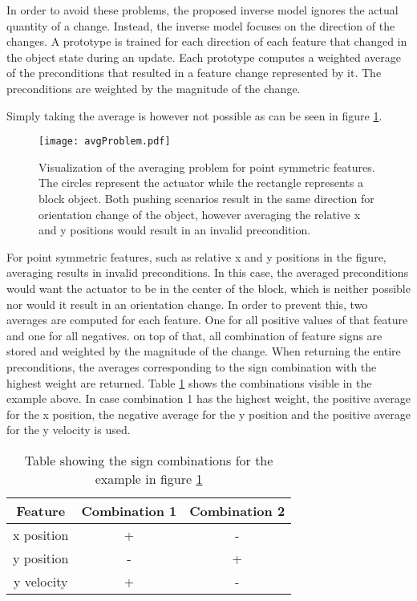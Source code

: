 In order to avoid these problems, the proposed inverse model ignores the actual quantity of a change. Instead, the inverse model focuses on the direction of the changes. A prototype is trained for each direction of each feature that changed in the object state during an update. Each prototype computes a weighted average of the preconditions that resulted in a feature change represented by it. The preconditions are weighted by the magnitude of the change. 

Simply taking the average is however not possible as can be seen in figure \ref{fig:avgProblem}.

\begin{figure}
	\centering
	\texttt{[image: avgProblem.pdf]}
	\caption{Visualization of the averaging problem for point symmetric features. The circles represent the actuator while the rectangle represents a block object. Both pushing scenarios result in the same direction for orientation change of the object, however averaging the relative x and y positions would result in an invalid precondition.} 
	\label{fig:avgProblem}
\end{figure}

For point symmetric features, such as relative x and y positions in the figure, averaging results in invalid preconditions. In this case, the averaged preconditions would want the actuator to be in the center of the block, which is neither possible nor would it result in an orientation change. In order to prevent this, two averages are computed for each feature. One for all positive values of that feature and one for all negatives. on top of that, all combination of feature signs are stored and weighted by the magnitude of the change. When returning the entire preconditions, the averages corresponding to the sign combination with the highest weight are returned. Table \ref{tab:signCombinations} shows the combinations visible in the example above. In case combination 1 has the highest weight, the positive average for the x position, the negative average for the y position and the positive average for the y velocity is used. 

\begin{table}
	\centering
\begin{tabular}{|c|c|c|}
	\hline Feature & Combination 1 & Combination 2 \\ 
	\hline x position & + & - \\ 
	\hline y position & - & + \\ 
	\hline y velocity & + & - \\ 
	\hline 
\end{tabular} 
\caption{Table showing the sign combinations for the example in figure \ref{fig:avgProblem}}
\label{tab:signCombinations}
\end{table}

